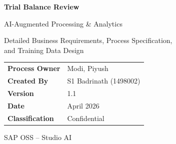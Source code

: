 \documentclass[11pt,a4paper]{article}
\begin{document}

\begin{titlepage}
\centering
\vspace*{3cm}

{\Huge\bfseries\textcolor{sapdark}{Trial Balance Review}\par}
\vspace{0.5cm}
{\LARGE\textcolor{sapblue}{AI-Augmented Processing \& Analytics}\par}
\vspace{0.5cm}
{\large Detailed Business Requirements, Process Specification,\\and Training Data Design\par}

\vspace{2cm}

\begin{tabular}{@{}ll@{}}
\textbf{Process Owner} & Modi, Piyush \\
\textbf{Created By} & S1 Badrinath (1498002) \\
\textbf{Version} & 1.1 \\
\textbf{Date} & April 2026 \\
\textbf{Classification} & Confidential \\
\end{tabular}

\vspace{2cm}

\begin{abstract}
\noindent
This document provides the detailed specification for AI-augmented Trial Balance (TB) review, 
covering the month-end close process across 234 legal entities. It consolidates the business 
requirements, formal process specification (state machine with 27 states and 5 decision gateways), 
training data design from the HKG TB/PL workbooks, and data schema definitions.
\end{abstract}

\vfill
{\small SAP OSS -- Studio AI}

\end{titlepage}


\tableofcontents
\newpage
\end{document}
